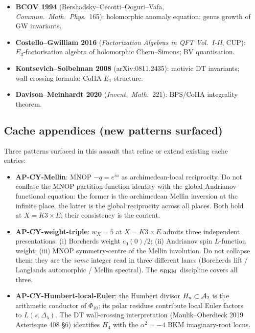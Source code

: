 \begin{itemize}[leftmargin=1.5em]
  1): topological recursion and Borel-summability of GW
  amplitudes.
\item \textbf{BCOV 1994} (Bershadsky--Cecotti--Ooguri--Vafa,
  \emph{Commun.\ Math.\ Phys.}\ 165): holomorphic anomaly
  equation; genus growth of GW invariants.
\item \textbf{Costello--Gwilliam 2016} (\emph{Factorization Algebras
  in QFT Vol.\ I-II}, CUP): $E_3$-factorisation algebra of
  holomorphic Chern--Simons; BV quantisation.
\item \textbf{Kontsevich--Soibelman 2008} (arXiv:0811.2435):
  motivic DT invariants; wall-crossing formula; CoHA
  $E_1$-structure.
\item \textbf{Davison--Meinhardt 2020} (\emph{Invent.\ Math.}\ 221):
  BPS/CoHA integrality theorem.
\end{itemize}

\subsection*{Cache appendices (new patterns surfaced)}

Three patterns surfaced in this assault that refine or extend
existing cache entries:

\begin{itemize}[leftmargin=1.5em]
\item \textbf{AP-CY-Mellin}: MNOP $-q=e^{iu}$ as archimedean-local
  reciprocity. Do not conflate the MNOP partition-function identity
  with the global Andrianov functional equation: the former is the
  archimedean Mellin inversion at the infinite place, the latter is
  the global reciprocity across all places. Both hold at
  $X=K3\times E$; their consistency is the content.
\item \textbf{AP-CY-weight-triple}: $w_X=5$ at $X=K3\times E$ admits
  three independent presentations: (i) Borcherds weight
  $c_0(0)/2$; (ii) Andrianov spin $L$-function weight; (iii)
  MNOP symmetry-centre of the Mellin involution. Do not collapse
  them; they are the \emph{same} integer read in three different
  lanes (Borcherds lift / Langlands automorphic / Mellin
  spectral). The $\kappa_{\mathrm{BKM}}$ discipline covers all three.
\item \textbf{AP-CY-Humbert-local-Euler}: the Humbert divisor
  $H_n\subset\mathcal{A}_2$ is the arithmetic conductor of $\Phi_{10}$;
  its polar residues contribute local Euler factors to
  $L(s,\Delta_5)$. The DT wall-crossing interpretation (Maulik--Oberdieck
  2019 Asterisque 408 \S6) identifies $H_4$ with
  the $\alpha^2=-4$ BKM imaginary-root locus.
\end{itemize}

